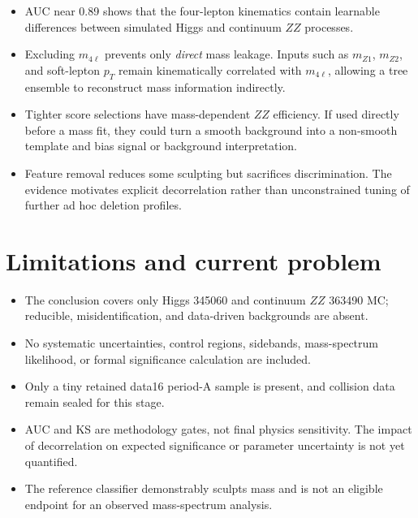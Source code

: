 \documentclass[11pt,a4paper]{article}
\begin{document}
\begin{itemize}
  \item AUC near 0.89 shows that the four-lepton kinematics contain learnable differences between simulated Higgs and continuum $ZZ$ processes.
  \item Excluding $m_{4\ell}$ prevents only \emph{direct} mass leakage. Inputs such as $m_{Z1}$, $m_{Z2}$, and soft-lepton $p_T$ remain kinematically correlated with $m_{4\ell}$, allowing a tree ensemble to reconstruct mass information indirectly.
  \item Tighter score selections have mass-dependent $ZZ$ efficiency. If used directly before a mass fit, they could turn a smooth background into a non-smooth template and bias signal or background interpretation.
  \item Feature removal reduces some sculpting but sacrifices discrimination. The evidence motivates explicit decorrelation rather than unconstrained tuning of further ad hoc deletion profiles.
\end{itemize}

\section{Limitations and current problem}

\begin{itemize}
  \item The conclusion covers only Higgs 345060 and continuum $ZZ$ 363490 MC; reducible, misidentification, and data-driven backgrounds are absent.
  \item No systematic uncertainties, control regions, sidebands, mass-spectrum likelihood, or formal significance calculation are included.
  \item Only a tiny retained data16 period-A sample is present, and collision data remain sealed for this stage.
  \item AUC and KS are methodology gates, not final physics sensitivity. The impact of decorrelation on expected significance or parameter uncertainty is not yet quantified.
  \item The reference classifier demonstrably sculpts mass and is not an eligible endpoint for an observed mass-spectrum analysis.
\end{itemize}
\end{document}
